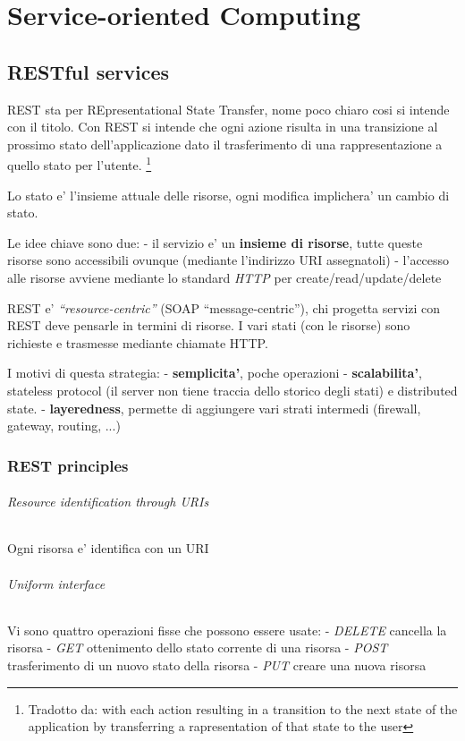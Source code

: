 \part{Service-oriented Computing}
\chapter{RESTful services}
\label{RESTful}

REST sta per REpresentational State Transfer, nome poco chiaro cosi si intende con il titolo.
Con \gls{REST} si intende che ogni azione risulta in una transizione al prossimo stato
dell'applicazione dato il trasferimento di una rappresentazione a quello stato per l'utente.
\footnote{Tradotto da: with each action resulting in a transition to the next state of
  the application by transferring a rapresentation of that state to the user}

Lo stato e' l'insieme attuale delle risorse, ogni modifica implichera' un cambio di stato.

Le idee chiave sono due:
- il servizio e' un \textbf{insieme di risorse}, tutte queste risorse sono accessibili ovunque
(mediante l'indirizzo URI assegnatoli)
- l'accesso alle risorse avviene mediante lo standard \textit{HTTP} per create/read/update/delete

\gls{REST} e' \textit{``resource-centric''} (SOAP ``message-centric''), chi progetta servizi con \gls{REST} deve
pensarle in termini di risorse. I vari stati (con le risorse) sono richieste e trasmesse mediante
chiamate HTTP.

I motivi di questa strategia:
- \textbf{semplicita'}, poche operazioni
- \textbf{scalabilita'}, stateless protocol (il server non tiene traccia dello storico degli stati) e
distributed state.
- \textbf{layeredness}, permette di aggiungere vari strati intermedi (firewall, gateway, routing, ...)

\section{REST principles}
\paragraph{Resource identification through URIs}
Ogni risorsa e' identifica con un URI
\paragraph{Uniform interface}
Vi sono quattro operazioni fisse che possono essere usate:
- \textit{DELETE} cancella la risorsa
- \textit{GET} ottenimento dello stato corrente di una risorsa
- \textit{POST} trasferimento di un nuovo stato della risorsa
- \textit{PUT} creare una nuova risorsa
